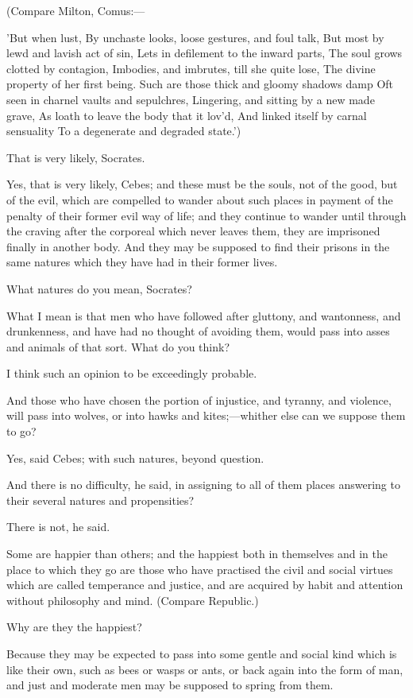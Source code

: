 (Compare Milton, Comus:—

'But when lust,
By unchaste looks, loose gestures, and foul talk,
But most by lewd and lavish act of sin,
Lets in defilement to the inward parts,
The soul grows clotted by contagion,
Imbodies, and imbrutes, till she quite lose,
The divine property of her first being.
Such are those thick and gloomy shadows damp
Oft seen in charnel vaults and sepulchres,
Lingering, and sitting by a new made grave,
As loath to leave the body that it lov'd,
And linked itself by carnal sensuality
To a degenerate and degraded state.')

That is very likely, Socrates.

Yes, that is very likely, Cebes; and these must be the souls, not of the
good, but of the evil, which are compelled to wander about such places in
payment of the penalty of their former evil way of life; and they continue
to wander until through the craving after the corporeal which never leaves
them, they are imprisoned finally in another body. And they may be
supposed to find their prisons in the same natures which they have had in
their former lives.

What natures do you mean, Socrates?

What I mean is that men who have followed after gluttony, and wantonness,
and drunkenness, and have had no thought of avoiding them, would pass into
asses and animals of that sort. What do you think?

I think such an opinion to be exceedingly probable.

And those who have chosen the portion of injustice, and tyranny, and
violence, will pass into wolves, or into hawks and kites;—whither
else can we suppose them to go?

Yes, said Cebes; with such natures, beyond question.

And there is no difficulty, he said, in assigning to all of them places
answering to their several natures and propensities?

There is not, he said.

Some are happier than others; and the happiest both in themselves and in
the place to which they go are those who have practised the civil and
social virtues which are called temperance and justice, and are acquired
by habit and attention without philosophy and mind. (Compare Republic.)

Why are they the happiest?

Because they may be expected to pass into some gentle and social kind
which is like their own, such as bees or wasps or ants, or back again into
the form of man, and just and moderate men may be supposed to spring from
them.

